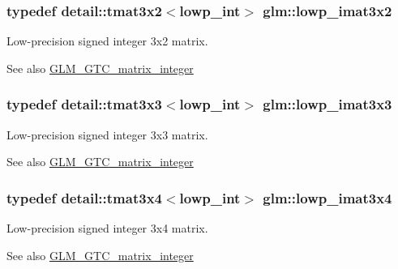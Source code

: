 \subsubsection[{lowp\+\_\+imat3x2}]{\setlength{\rightskip}{0pt plus 5cm}typedef detail\+::tmat3x2$<$lowp\+\_\+int$>$ {\bf glm\+::lowp\+\_\+imat3x2}}\label{group__gtc__matrix__integer_gac67f73a4e34205b8d96af7e85cc7a194}
Low-\/precision signed integer 3x2 matrix. \begin{DoxySeeAlso}{See also}
\hyperlink{group__gtc__matrix__integer}{G\+L\+M\+\_\+\+G\+T\+C\+\_\+matrix\+\_\+integer} 
\end{DoxySeeAlso}
\hypertarget{group__gtc__matrix__integer_ga3e100ab14fdaeae0d30d66d93c6904a7}{}
\subsubsection[{lowp\+\_\+imat3x3}]{\setlength{\rightskip}{0pt plus 5cm}typedef detail\+::tmat3x3$<$lowp\+\_\+int$>$ {\bf glm\+::lowp\+\_\+imat3x3}}\label{group__gtc__matrix__integer_ga3e100ab14fdaeae0d30d66d93c6904a7}
Low-\/precision signed integer 3x3 matrix. \begin{DoxySeeAlso}{See also}
\hyperlink{group__gtc__matrix__integer}{G\+L\+M\+\_\+\+G\+T\+C\+\_\+matrix\+\_\+integer} 
\end{DoxySeeAlso}
\hypertarget{group__gtc__matrix__integer_gaefcf7682fee103d6f8c9315420a6bcd5}{}
\subsubsection[{lowp\+\_\+imat3x4}]{\setlength{\rightskip}{0pt plus 5cm}typedef detail\+::tmat3x4$<$lowp\+\_\+int$>$ {\bf glm\+::lowp\+\_\+imat3x4}}\label{group__gtc__matrix__integer_gaefcf7682fee103d6f8c9315420a6bcd5}
Low-\/precision signed integer 3x4 matrix. \begin{DoxySeeAlso}{See also}
\hyperlink{group__gtc__matrix__integer}{G\+L\+M\+\_\+\+G\+T\+C\+\_\+matrix\+\_\+integer} 
\end{DoxySeeAlso}
\hypertarget{group__gtc__matrix__integer_ga644e005864dce94a642fcfe939538deb}{}

